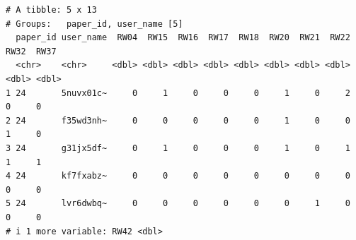 \documentclass[article]{jss}
\begin{document}
\begin{verbatim}
# A tibble: 5 x 13
# Groups:   paper_id, user_name [5]
  paper_id user_name  RW04  RW15  RW16  RW17  RW18  RW20  RW21  RW22  RW32  RW37
  <chr>    <chr>     <dbl> <dbl> <dbl> <dbl> <dbl> <dbl> <dbl> <dbl> <dbl> <dbl>
1 24       5nuvx01c~     0     1     0     0     0     1     0     2     0     0
2 24       f35wd3nh~     0     0     0     0     0     1     0     0     1     0
3 24       g31jx5df~     0     1     0     0     0     1     0     1     1     1
4 24       kf7fxabz~     0     0     0     0     0     0     0     0     0     0
5 24       lvr6dwbq~     0     0     0     0     0     0     1     0     0     0
# i 1 more variable: RW42 <dbl>
\end{verbatim}

\begin{table}


\caption{\label{tbl-reason-wagg-focal-claim}Focal Claim \(24\)
judgements comprising best estimates, upper and lower bounds elicited
from five participants. Judgements are displayed as percentages.}

\end{table}%
\end{document}
